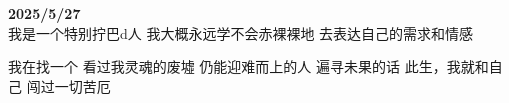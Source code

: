\documentclass[12pt]{book}
\newenvironment{loggentry}[2]%
{\noindent\textbf{#1} \qquad \textbf{#2}\vspace{0.2em} \\  \indent}{\vspace{1em}}
\begin{document}
\begin{loggentry}{2025/5/27}{}
我是一个特别拧巴d人
我大概永远学不会赤裸裸地
去表达自己的需求和情感

我在找一个
看过我灵魂的废墟
仍能迎难而上的人
遍寻未果的话
此生，我就和自己
闯过一切苦厄
\end{loggentry}
\end{document}
